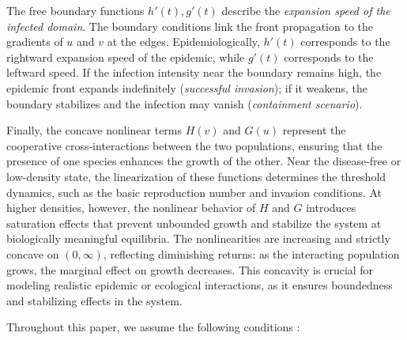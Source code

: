 \documentclass[a4paper,11pt]{amsart}
\theoremstyle{definition}
\numberwithin{equation}{section}
\theoremstyle{definition}
\begin{document}
The free boundary functions $h'(t), g'(t)$ describe the \emph{expansion speed of the infected domain}. The boundary conditions link the front propagation to the gradients of $u$ and $v$ at the edges. Epidemiologically, $h'(t)$ corresponds to the rightward expansion speed of the epidemic, while $g'(t)$ corresponds to the leftward speed. If the infection intensity near the boundary remains high, the epidemic front expands indefinitely (\emph{successful invasion}); if it weakens, the boundary stabilizes and the infection may vanish (\emph{containment scenario}).

Finally, the concave nonlinear terms $H(v)$ and $G(u)$ represent the cooperative cross-interactions between the two populations, ensuring that the presence of one species enhances the growth of the other. Near the disease-free or low-density state, the linearization of these functions determines the threshold dynamics, such as the basic reproduction number and invasion conditions. At higher densities, however, the nonlinear behavior of $H$ and $G$ introduces saturation effects that prevent unbounded growth and stabilize the system at biologically meaningful equilibria. The nonlinearities are increasing and strictly concave on $(0,\infty)$, reflecting diminishing returns: as the interacting population grows, the marginal effect on growth decreases. This concavity is crucial for modeling realistic epidemic or ecological interactions, as it ensures boundedness and stabilizing effects in the system.

Throughout this paper, we assume the following conditions :
\end{document}
